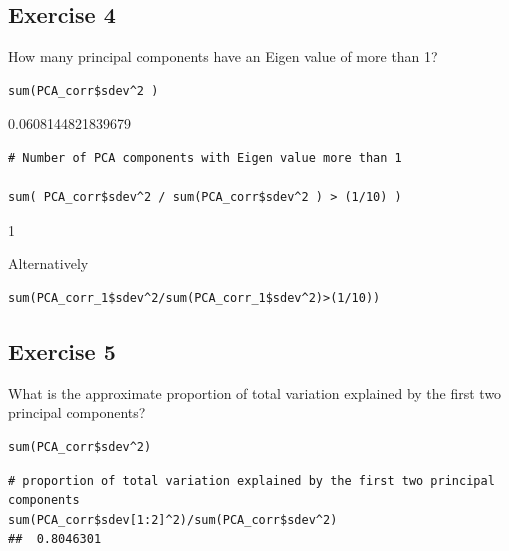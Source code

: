 \documentclass[a4paper,12pt]{article}
\begin{document}
\subsection*{Exercise 4}

\noindent How many principal components have an Eigen value of more than 1? 




\begin{framed} \begin{verbatim}
sum(PCA_corr$sdev^2 )
\end{verbatim}\end{framed} 


0.0608144821839679



\begin{framed} \begin{verbatim}
# Number of PCA components with Eigen value more than 1

sum( PCA_corr$sdev^2 / sum(PCA_corr$sdev^2 ) > (1/10) )

\end{verbatim}\end{framed} 


1


Alternatively


\begin{framed} \begin{verbatim}
sum(PCA_corr_1$sdev^2/sum(PCA_corr_1$sdev^2)>(1/10))
\end{verbatim}\end{framed} 

\newpage 
\subsection*{Exercise 5}

\noindent What is the approximate proportion of total variation explained by the first two principal components? 



\begin{framed} \begin{verbatim}
sum(PCA_corr$sdev^2)
\end{verbatim}\end{framed} 


\begin{framed} \begin{verbatim}
# proportion of total variation explained by the first two principal components
sum(PCA_corr$sdev[1:2]^2)/sum(PCA_corr$sdev^2)
##  0.8046301


\end{verbatim}\end{framed} 
\end{document}
